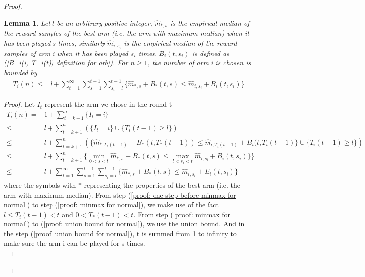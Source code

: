 \documentclass{article}
\theoremstyle{plain}
\newtheorem{lemma}{Lemma}
\begin{document}
\begin{proof}
\begin{lemma}
\label{Lemma 2 normal}
Let $l$ be an arbitrary positive integer, $\hat{m}_{*, s}$ is the empirical median of the reward samples of the best arm (i.e. the arm with maximum median) when it has been played s times, similarly $\hat{m}_{i, s_i}$ is the empirical median of the reward samples of arm i when it has been played $s_i$ times. $B_i(t, s_i)$ is defined as (\ref{B_i(i, T_i(t)) definition for arb}). For $n \geq 1$, the number of arm i is chosen is bounded by
\begin{align}
    T_i(n) \leq & l + \sum_{t = 1}^\infty \sum_{s = 1}^{t-1} \sum_{s_i = l}^{t-1} \{\hat{m}_{*, s} + B_*(t, s)  \leq \hat{m}_{i, s_i} + B_i(t, s_i)\}
\end{align}
\end{lemma}

\begin{proof}
Let $I_t$ represent the arm we chose in the round t
    \begin{align}
        T_i(n) =& 1 + \sum_{t = k + 1}^n \{I_t = i\}\\
       \leq & l + \sum_{t = k + 1}^n (\{I_t = i\} \cup \{T_i(t-1) \geq l\})\\
       \label{proof: one step before minmax for normal}
       \leq & l + \sum_{t = k + 1}^n \left(\{ \hat{m}_{*, T_*(t-1)} + B_*(t, T_*(t-1)) \leq \hat{m}_{i, T_i(t-1)} + B_i(t, T_i(t-1)\} \cup \{ T_i(t-1) \geq l\}\right)\\
       \label{proof: minmax for normal}
       \leq & l + \sum_{t = k + 1}^n \{ \mathop{min}\limits_{0 < s < t}\hat{m}_{*, s} + B_*(t, s) \leq \mathop{max}\limits_{l < s_i < t}\hat{m}_{i, s_i} + B_i(t, s_i)\}\}\\
       \label{proof: union bound for normal}
       \leq & l + \sum_{t = 1}^\infty \sum_{s = 1}^{t-1} \sum_{s_i = l}^{t-1} \{\hat{m}_{*, s} + B_*(t, s)  \leq \hat{m}_{i, s_i} + B_i(t, s_i)\}
    \end{align}
    where the symbols with $*$ representing the properties of the best arm (i.e. the arm with maximum median). From step (\ref{proof: one step before minmax for normal}) to step (\ref{proof: minmax for normal}), we make use of the fact $l \leq T_i(t-1) < t$ and $0 < T_*(t-1) < t$. From step (\ref{proof: minmax for normal}) to (\ref{proof: union bound for normal}), we use the union bound. And in the step (\ref{proof: union bound for normal}), t is summed from 1 to infinity to make sure the arm i can be played for s times.\\
\end{proof}


\end{proof}
\end{document}
